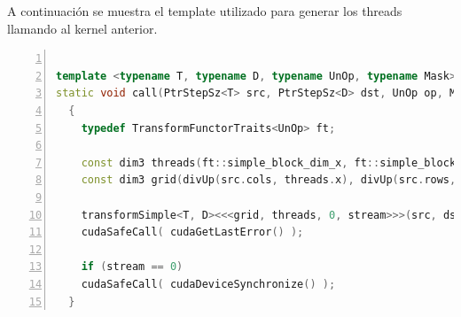 \documentclass[a4paper,10pt]{report}
\begin{document}
A continuación se muestra el template utilizado para generar los threads llamando al kernel anterior.



\begin{lstlisting}[frame=bt,title={aa},caption={gpu/include/opencv2/gpu/device/detail/transform\_detail.hpp},
columns=fullflexible,numbers=left,backgroundcolor=\color{LemonChiffon1},basicstyle=\footnotesize,keywordstyle=\ttfamily\footnotesize,language=C++,stringstyle=\ttfamily,breaklines=true,xleftmargin=0.5em,xrightmargin=0pt,aboveskip=\bigskipamount,belowskip=\bigskipamount]

template <typename T, typename D, typename UnOp, typename Mask>
static void call(PtrStepSz<T> src, PtrStepSz<D> dst, UnOp op, Mask mask, cudaStream_t stream)
  {
    typedef TransformFunctorTraits<UnOp> ft;

    const dim3 threads(ft::simple_block_dim_x, ft::simple_block_dim_y, 1);
    const dim3 grid(divUp(src.cols, threads.x), divUp(src.rows, threads.y), 1);

    transformSimple<T, D><<<grid, threads, 0, stream>>>(src, dst, mask, op);
    cudaSafeCall( cudaGetLastError() );

    if (stream == 0)
	cudaSafeCall( cudaDeviceSynchronize() );
  }
\end{lstlisting}








% 
% 
% 
\end{document}
